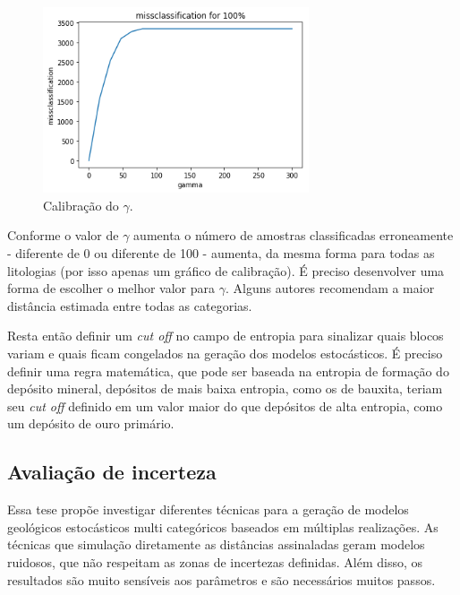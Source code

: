 \begin{figure}[H]
	\caption{\label{calib_gamma}Calibração do $\gamma$.}
	\begin{center}
		\includegraphics[width=0.7\textwidth]{capitulo_3/calib100.png}
	\end{center}
\end{figure}

Conforme o valor de $\gamma$ aumenta o número de amostras classificadas erroneamente - diferente de 0 ou diferente de 100 - aumenta, da mesma forma para todas as litologias (por isso apenas um gráfico de calibração). É preciso desenvolver uma forma de escolher o melhor valor para $\gamma$. Alguns autores recomendam a maior distância estimada entre todas as categorias.

Resta então definir um \textit{cut off} no campo de entropia para sinalizar quais blocos variam e quais ficam congelados na geração dos modelos estocásticos. É preciso definir uma regra matemática, que pode ser baseada na entropia de formação do depósito mineral, depósitos de mais baixa entropia, como os de bauxita, teriam seu \textit{cut off} definido em um valor maior do que depósitos de alta entropia, como um depósito de ouro primário.

\subsection{Avaliação de incerteza}

Essa tese propõe investigar diferentes técnicas para a geração de modelos geológicos estocásticos multi categóricos baseados em múltiplas realizações. As técnicas que simulação diretamente as distâncias assinaladas geram modelos ruidosos, que não respeitam as zonas de incertezas definidas. Além disso, os resultados são muito sensíveis aos parâmetros e são necessários muitos passos. 

